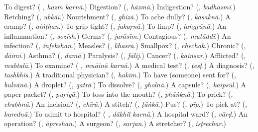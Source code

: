 \begin{tcolorbox}[breakable,colback=teal!4,colframe=teal!35!black,title={Before you move on}]
To digest? (\textbf{ }, \emph{hazm karnā}.) Digestion? (\textbf{}, \emph{hāzmā}.) Indigestion? (\textbf{}, \emph{badhazmī}.) Retching? (\textbf{}, \emph{ubkāī}.) Nourishment? (\textbf{}, \emph{ghizā}.) To ache dully? (\textbf{}, \emph{kasaknā}.) A cramp? (\textbf{}, \emph{aiṅṭhan}.) To grip tight? (\textbf{}, \emph{jakaṛnā}.) To limp? (\textbf{}, \emph{laṅgṛānā}.) An inflammation? (\textbf{}, \emph{sozish}.) Germs? (\textbf{}, \emph{jarāsīm}.) Contagious? (\textbf{}, \emph{mutāddī}.) An infection? (\textbf{}, \emph{infekshan}.) Measles? (\textbf{}, \emph{khasrā}.) Smallpox? (\textbf{}, \emph{chechak}.) Chronic? (\textbf{}, \emph{dāimī}.) Asthma? (\textbf{}, \emph{damā}.) Paralysis? (\textbf{}, \emph{fālij}.) Cancer? (\textbf{}, \emph{kainsar}.) Afflicted? (\textbf{}, \emph{mubtalā}.) To examine? (\textbf{ }, \emph{muāinā karnā}.) A medical test? (\textbf{}, \emph{ṭesṭ}.) A diagnosis? (\textbf{}, \emph{tashkhīs}.) A traditional physician? (\textbf{}, \emph{hakīm}.) To have (someone) sent for? (\textbf{}, \emph{bulvānā}.) A droplet? (\textbf{}, \emph{qatrā}.) To dissolve? (\textbf{}, \emph{gholnā}.) A capsule? (\textbf{}, \emph{kaipsūl}.) A paper packet? (\textbf{}, \emph{puṛiyā}.) To toss into the mouth? (\textbf{}, \emph{phāṅknā}.) To prick? (\textbf{}, \emph{chubhnā}.) An incision? (\textbf{}, \emph{chīrā}.) A stitch? (\textbf{}, \emph{ṭāṅkā}.) Pus? (\textbf{}, \emph{pīp}.) To pick at? (\textbf{}, \emph{kurednā}.) To admit to hospital? (\textbf{ }, \emph{dākhil karnā}.) A hospital ward? (\textbf{}, \emph{vārḍ}.) An operation? (\textbf{}, \emph{āpreshan}.) A surgeon? (\textbf{}, \emph{sarjan}.) A stretcher? (\textbf{}, \emph{isṭrechar}.)
\end{tcolorbox}
